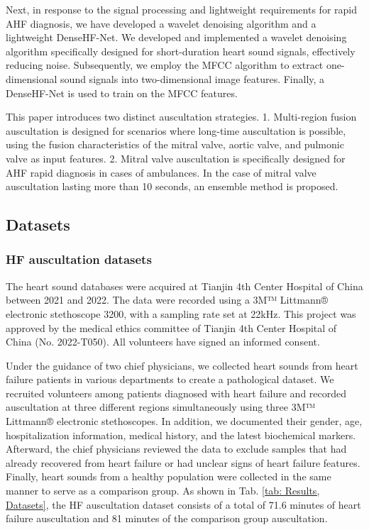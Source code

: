 Next, in response to the signal processing and lightweight requirements for rapid AHF diagnosis, we have developed a wavelet denoising algorithm and a lightweight DenseHF-Net. We developed and implemented a wavelet denoising algorithm specifically designed for short-duration heart sound signals, effectively reducing noise. Subsequently, we employ the MFCC algorithm to extract one-dimensional sound signals into two-dimensional image features. Finally, a DenseHF-Net is used to train on the MFCC features.

This paper introduces two distinct auscultation strategies. 1. Multi-region fusion auscultation is designed for
scenarios where long-time auscultation is possible, using the fusion characteristics of the mitral valve, aortic valve, and pulmonic valve as input features. 2. Mitral valve auscultation is specifically
designed for AHF rapid diagnosis in cases of ambulances. In the case of mitral valve auscultation lasting more than 10 seconds, an ensemble method is proposed. 
\subsection{Datasets}
\subsubsection{HF auscultation datasets}
The heart sound databases were acquired at Tianjin 4th Center Hospital of China between 2021 and 2022. The data were recorded using a 3M™ Littmann® electronic stethoscope 3200, with a sampling rate set at 22kHz. This project was approved by the medical ethics committee of Tianjin 4th Center Hospital of China (No. 2022-T050). All volunteers have signed an informed consent.

Under the guidance of two chief physicians, we collected heart sounds from heart failure patients in various departments to create a pathological dataset. We recruited volunteers among patients diagnosed with heart failure and recorded auscultation at three different regions simultaneously using three 3M™ Littmann® electronic stethoscopes. In addition, we documented their gender, age, hospitalization information, medical history, and the latest biochemical markers. Afterward, the chief physicians reviewed the data to exclude samples that had already recovered from heart failure or had unclear signs of heart failure features. Finally, heart sounds from a healthy population were collected in the same manner to serve as a comparison group. As shown in Tab. \ref{tab: Results, Datasets}, the HF auscultation dataset consists of a total of 71.6 minutes of heart failure auscultation and 81 minutes of the comparison group auscultation.

